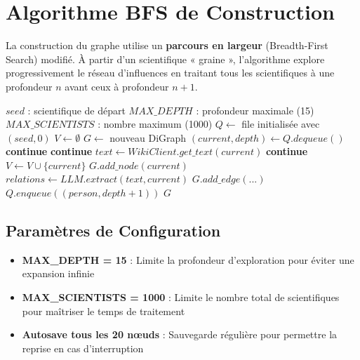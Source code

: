 \documentclass[12pt,a4paper]{report}
\begin{document}
\section{Algorithme BFS de Construction}

La construction du graphe utilise un \textbf{parcours en largeur} (Breadth-First Search) modifié. À partir d'un scientifique « graine », l'algorithme explore progressivement le réseau d'influences en traitant tous les scientifiques à une profondeur $n$ avant ceux à profondeur $n+1$.

\begin{algorithm}[H]
\caption{Construction du graphe d'influence}
\begin{algorithmic}[1]
\Require $seed$ : scientifique de départ
\Require $MAX\_DEPTH$ : profondeur maximale (15)
\Require $MAX\_SCIENTISTS$ : nombre maximum (1000)
\State $Q \gets$ file initialisée avec $(seed, 0)$
\State $V \gets \emptyset$ 
\State $G \gets$ nouveau DiGraph
    \State $(current, depth) \gets Q.dequeue()$
        \State \textbf{continue}
    \EndIf
        \State \textbf{continue}
    \EndIf
    \State $text \gets WikiClient.get\_text(current)$
        \State \textbf{continue}
    \EndIf
    \State $V \gets V \cup \{current\}$
    \State $G.add\_node(current)$
    \State $relations \gets LLM.extract(text, current)$
            \State $G.add\_edge(...)$
                \State $Q.enqueue((person, depth + 1))$
            \EndIf
        \EndIf
    \EndFor
\EndWhile
\State \Return $G$
\end{algorithmic}
\end{algorithm}

\subsection{Paramètres de Configuration}

\begin{itemize}
    \item \textbf{MAX\_DEPTH = 15} : Limite la profondeur d'exploration pour éviter une expansion infinie
    \item \textbf{MAX\_SCIENTISTS = 1000} : Limite le nombre total de scientifiques pour maîtriser le temps de traitement
    \item \textbf{Autosave tous les 20 nœuds} : Sauvegarde régulière pour permettre la reprise en cas d'interruption
\end{itemize}
\end{document}
